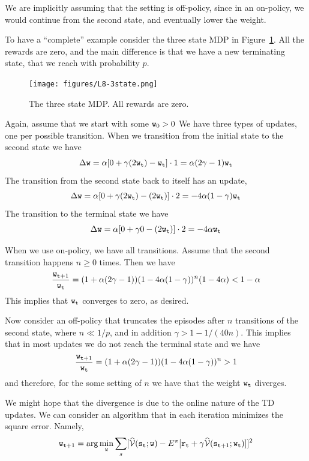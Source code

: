 We are implicitly assuming that the setting is off-policy, since in
an on-policy, we would continue from the second state, and
eventually lower the weight.

To have a ``complete'' example consider the three state MDP in
Figure~\ref{fig:L8-3state}. All the rewards are zero, and the main
difference is that we have a new terminating state, that we reach
with probability $p$.

\begin{figure}
  \begin{centering}
  \texttt{[image: figures/L8-3state.png]}\\
  \caption{The three state MDP. All rewards are zero.}\label{fig:L8-3state}
  \end{centering}
\end{figure}




Again, assume that we start with some ${\tt w}_0>0$ We have three
types of updates, one per possible transition. When we transition
from the initial state to the second state we have
\[
\Delta {\tt w}= \alpha[0+\gamma
(2{\tt w}_{\tt t})-{\tt w}_{\tt t}]\cdot
1=\alpha(2\gamma-1){\tt w}_{\tt t}
\]
The transition from the second state back to itself has an update,
\[
\Delta {\tt w}= \alpha[0+\gamma
(2{\tt w}_{\tt t})-(2{\tt w}_{\tt t})]\cdot 2
=-4\alpha(1-\gamma){\tt w}_{\tt t}
\]
The transition to the terminal state we have
\[
\Delta {\tt w}= \alpha[0+\gamma 0 -(2{\tt w}_{\tt t})]\cdot
2=-4\alpha {\tt w}_{\tt t}
\]



When we use on-policy, we have all transitions. Assume that the
second transition happens $n\geq 0$ times. Then we have
\[
\frac{{\tt w}_{{\tt t}+1}}{{\tt w}_{\tt t}}=(1+\alpha(2\gamma-1))(1-4\alpha(1-\gamma))^n(1-4\alpha)<
1-\alpha
\]
This implies that ${\tt w}_{\tt t}$ converges to zero, as desired.

Now consider an off-policy that truncates the episodes after $n$
transitions of the second state, where $n\ll 1/p$, and in addition
$\gamma> 1-1/(40n)$. This implies that in most updates we do not
reach the terminal state and we have
\[
\frac{{\tt w}_{{\tt t}+1}}{{\tt w}_{\tt t}}=(1+\alpha(2\gamma-1))(1-4\alpha(1-\gamma))^n>1
\]
and therefore, for the some setting of $n$ we have that the weight
${\tt w}_{\tt t}$ diverges.

We might hope that the divergence is due to the online nature of the
TD updates. We can consider an algorithm that in each iteration
minimizes the square error. Namely,
\[
{\tt w}_{{\tt t}+1}=\arg\min_{\tt w}\sum_s
[\widehat{\mathcal{V}}({\tt s}_{\tt t};{\tt w})-E^\pi[{\tt r}_{\tt t}+\gamma\widehat{\mathcal{V}}({\tt s}_{{\tt t}+1};{\tt w}_{\tt t})]]^2
\]

